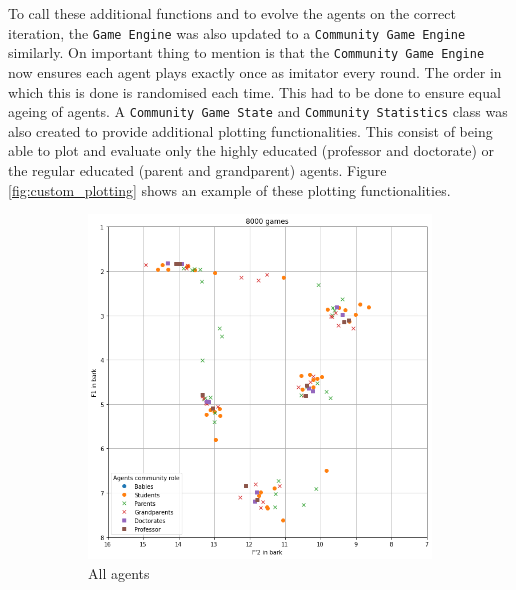 To call these additional functions and to evolve the agents on the correct iteration, the \texttt{Game Engine} was also updated to a \texttt{Community Game Engine} similarly.
On important thing to mention is that the \texttt{Community Game Engine} now ensures each agent plays exactly once as imitator every round.
The order in which this is done is randomised each time.
This had to be done to ensure equal ageing of agents.
A \texttt{Community Game State} and \texttt{Community Statistics} class was also created to provide additional plotting functionalities.
This consist of being able to plot and evaluate only the highly educated (professor and doctorate) or the regular educated (parent and grandparent) agents.
Figure \ref{fig:custom_plotting} shows an example of these plotting functionalities.

\begin{figure}[ht]
    \centering
    \begin{subfigure}{.30\textwidth}
        \centering
        \includegraphics[width=\textwidth]{images/extension/sample_all.png}
        \captionsetup{width=0.9\linewidth}
        \captionsetup{justification=centering}
        \caption{All agents}
    \end{subfigure}
    \hspace{0.5cm}
    \begin{subfigure}{.30\textwidth}

\end{subfigure}
\end{figure}
